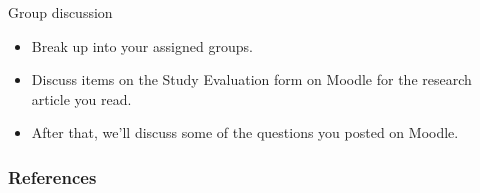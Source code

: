 \documentclass{beamer}
\begin{document}
% 
\begin{frame}{Group discussion}
	\begin{itemize}
	\item Break up into your assigned groups.
	\item Discuss items on the Study Evaluation form on Moodle for the research article you read.
	\item After that, we'll discuss some of the questions you posted on Moodle.
	\end{itemize}
\end{frame}

%
\begin{frame}[shrink=15] %
	\frametitle{References}
	
	\small
\end{frame}
\end{document}
